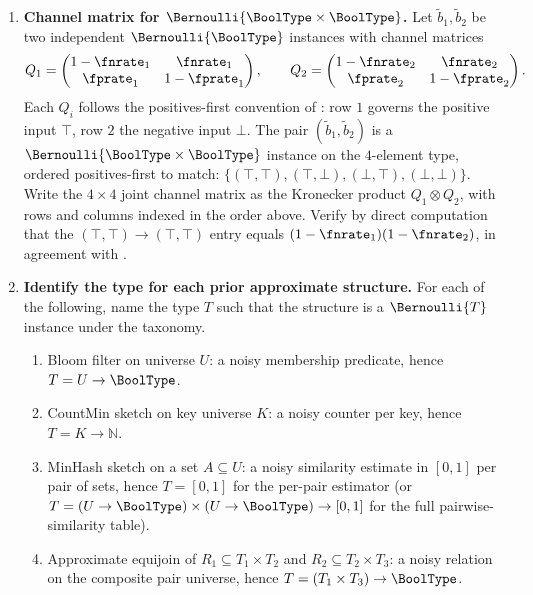 \begin{enumerate}


\item \exstar
\label{ex:ch13-1}
\textbf{Channel matrix for $\Bernoulli{\BoolType \times \BoolType}$.}
Let $\tilde b_1, \tilde b_2$ be two independent
$\Bernoulli{\BoolType}$ instances with channel matrices
\[
  Q_1 = \begin{pmatrix} 1 - \fnrate_1 & \fnrate_1 \\
                        \fprate_1 & 1 - \fprate_1 \end{pmatrix},
  \qquad
  Q_2 = \begin{pmatrix} 1 - \fnrate_2 & \fnrate_2 \\
                        \fprate_2 & 1 - \fprate_2 \end{pmatrix}.
\]
Each $Q_i$ follows the positives-first convention of
: row $1$ governs the positive input $\top$,
row $2$ the negative input $\bot$. The pair $(\tilde b_1, \tilde b_2)$
is a $\Bernoulli{\BoolType \times \BoolType}$ instance on the
$4$-element type, ordered positives-first to match:
$\{(\top, \top), (\top, \bot), (\bot, \top), (\bot, \bot)\}$.
Write the $4 \times 4$ joint channel matrix as the Kronecker product
$Q_1 \otimes Q_2$, with rows and columns indexed in the order above.
Verify by direct computation that the $(\top, \top) \to (\top, \top)$
entry equals $(1 - \fnrate_1)(1 - \fnrate_2)$, in agreement with
.

\item \exstar
\label{ex:ch13-2}
\textbf{Identify the type for each prior approximate structure.}
For each of the following, name the type $T$ such that the
structure is a $\Bernoulli{T}$ instance under the
 taxonomy.
\begin{enumerate}
  \item[(a)] Bloom filter on universe $U$: a noisy membership
    predicate, hence $T = U \to \BoolType$.
  \item[(b)] CountMin sketch on key universe $K$: a noisy counter
    per key, hence $T = K \to \mathbb{N}$.
  \item[(c)] MinHash sketch on a set $A \subseteq U$: a noisy
    similarity estimate in $[0, 1]$ per pair of sets, hence
    $T = [0, 1]$ for the per-pair estimator (or
    $T = (U \to \BoolType) \times (U \to \BoolType) \to [0, 1]$ for
    the full pairwise-similarity table).
  \item[(d)] Approximate equijoin of $R_1 \subseteq T_1 \times T_2$
    and $R_2 \subseteq T_2 \times T_3$: a noisy relation on the
    composite pair universe, hence
    $T = (T_1 \times T_3) \to \BoolType$.
\end{enumerate}


\end{enumerate}
